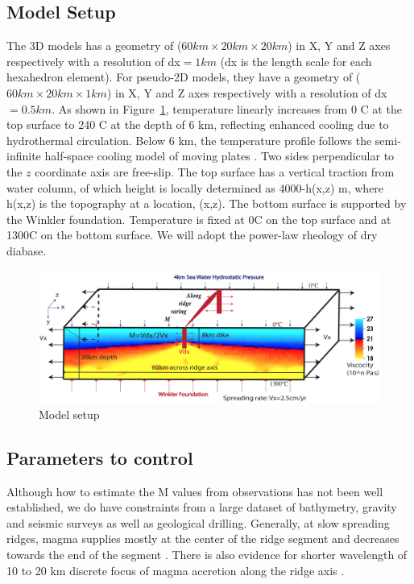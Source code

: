 \subsection{Model Setup}
The 3D models has a geometry of ($60km \times 20km \times 20km$) in X, Y and Z axes respectively with a resolution of dx$=1km$ (dx is the length scale for each hexahedron element). For pseudo-2D models, they have a geometry of ($60km \times 20km \times 1km$) in X, Y and Z axes respectively with a resolution of dx$=0.5km$. As shown in Figure~\ref{fig_Methods8_1}, temperature linearly increases from 0 \degree C at the top surface to 240 \degree C at the depth of 6 km, reflecting enhanced cooling due to hydrothermal circulation. Below 6 km, the temperature profile follows the semi-infinite half-space cooling model of moving plates \citep[e.g.,][]{Turcotte2002}. Two sides perpendicular to the $z$ coordinate axis are free-slip. The top surface has a vertical traction from water column, of which height is locally determined as 4000-h(x,z) m, where h(x,z) is the topography at a location, (x,z). The bottom surface is supported by the Winkler foundation. Temperature is fixed at 0\degree C on the top surface and at 1300\degree C on the bottom surface. We will adopt the power-law rheology of dry diabase\citep[e.g.,][]{Kirby1987, Buck2005}. 

\begin{figure}[H]
 \centering
  \includegraphics[width=1.0\textwidth] {fig_Methods8_1.png}
 \caption{\small Model setup}
 \label{fig_Methods8_1}
\end{figure}


\subsection{Parameters to control}
Although how to estimate the M values from observations has not been well established, we do have constraints from a large dataset of bathymetry, gravity and seismic surveys as well as geological drilling. Generally, at slow spreading ridges, magma supplies mostly at the center of the ridge segment and decreases towards the end of the segment \citep{Tolstoy1993,Chen1999}. There is also evidence for shorter wavelength of 10 to 20 km discrete focus of magma accretion along the ridge axis \citep{Lin1990}. 

